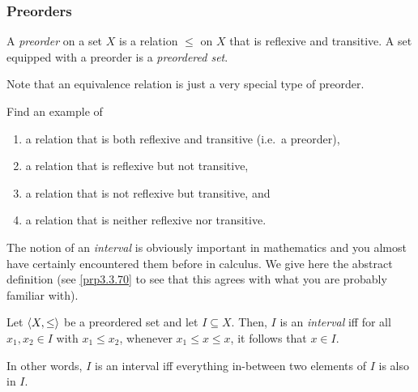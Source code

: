 \subsubsection{Preorders}

\begin{dfn}[Preorder]\label{dfnA.1.19}
A \emph{preorder} on a set $X$ is a relation $\leq$ on $X$ that is reflexive and transitive.  A set equipped with a preorder is a \emph{preordered set}.
\end{dfn}
\begin{rmk}
Note that an equivalence relation is just a very special type of preorder.
\end{rmk}
\begin{exr}
Find an example of
\begin{enumerate}
\item a relation that is both reflexive and transitive (i.e.~a preorder),
\item a relation that is reflexive but not transitive,
\item a relation that is not reflexive but transitive, and
\item a relation that is neither reflexive nor transitive.
\end{enumerate}
\end{exr}
The notion of an \emph{interval} is obviously important in mathematics and you almost have certainly encountered them before in calculus.  We give here the abstract definition (see \cref{prp3.3.70} to see that this agrees with what you are probably familiar with).
\begin{dfn}[Interval]\label{Interval}
Let $\langle X,\leq\rangle$ be a preordered set and let $I\subseteq X$.  Then, $I$ is an \emph{interval} iff for all $x_1,x_2\in I$ with $x_1\leq x_2$, whenever $x_1\leq x\leq x$, it follows that $x\in I$.
\begin{rmk}
In other words, $I$ is an interval iff everything in-between two elements of $I$ is also in $I$.
\end{rmk}
\end{dfn}
